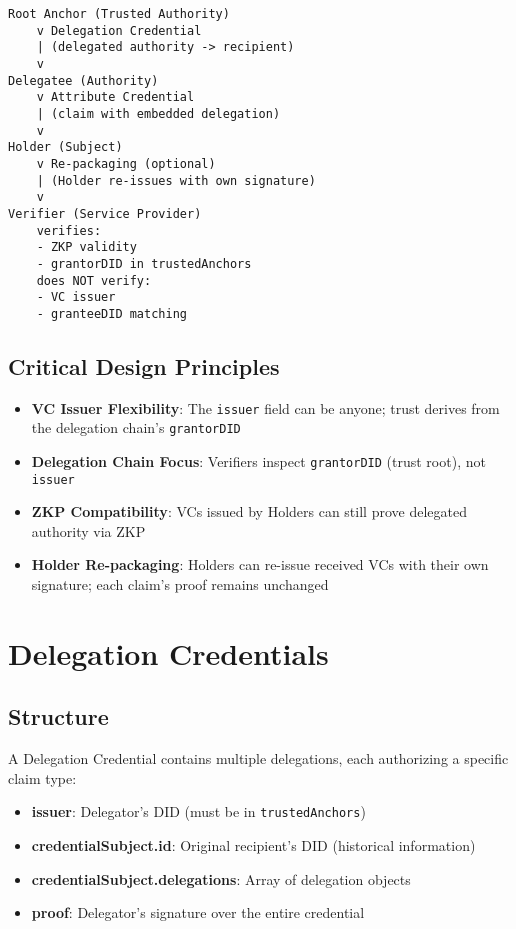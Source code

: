 \begin{center}
\begin{verbatim}
Root Anchor (Trusted Authority)
    v Delegation Credential
    | (delegated authority -> recipient)
    v
Delegatee (Authority)
    v Attribute Credential
    | (claim with embedded delegation)
    v
Holder (Subject)
    v Re-packaging (optional)
    | (Holder re-issues with own signature)
    v
Verifier (Service Provider)
    verifies:
    - ZKP validity
    - grantorDID in trustedAnchors
    does NOT verify:
    - VC issuer
    - granteeDID matching
\end{verbatim}
\end{center}

\subsection{Critical Design Principles}

\begin{itemize}
  \item \textbf{VC Issuer Flexibility}: The \texttt{issuer} field can be anyone; trust derives from the delegation chain's \texttt{grantorDID}
  \item \textbf{Delegation Chain Focus}: Verifiers inspect \texttt{grantorDID} (trust root), not \texttt{issuer}
  \item \textbf{ZKP Compatibility}: VCs issued by Holders can still prove delegated authority via ZKP
  \item \textbf{Holder Re-packaging}: Holders can re-issue received VCs with their own signature; each claim's proof remains unchanged
\end{itemize}

\section{Delegation Credentials}

\subsection{Structure}

A Delegation Credential contains multiple delegations, each authorizing a specific claim type:

\begin{itemize}
  \item \textbf{issuer}: Delegator's DID (must be in \texttt{trustedAnchors})
  \item \textbf{credentialSubject.id}: Original recipient's DID (historical information)
  \item \textbf{credentialSubject.delegations}: Array of delegation objects
  \item \textbf{proof}: Delegator's signature over the entire credential
\end{itemize}

